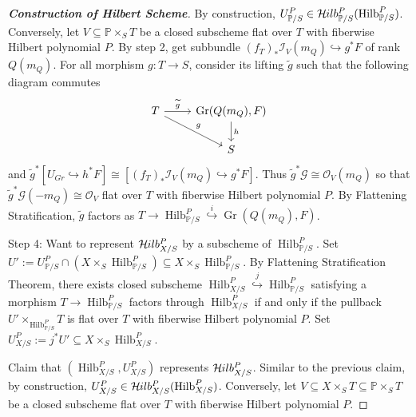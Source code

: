 \documentclass{ctexart}
\newcommand{\grassmannianscheme}[2]{\operatorname{Gr}(#1, #2)}
\newcommand{\hilbertscheme}{\operatorname{Hilb}}
\newcommand{\hilbertfunctor}{\mathcal{H}\kern -.5pt ilb}
\begin{document}
\begin{proof}[\textbf{\emph{Construction of Hilbert Scheme}}]
    By construction, $U_{\mathbb{P}/S}^{P}\in \hilbertfunctor_{\mathbb{P}/S}^{P}(\hilbertscheme_{\mathbb{P}/S}^{P})$.
    Conversely, let $V \subseteq \mathbb{P} \times_{S} T$ be a closed subscheme flat over $T$ with fiberwise Hilbert polynomial $P$.
    By step 2, get subbundle $(f_{T})_{\ast}\mathcal{I}_{V}(m_{Q}) \hookrightarrow g^{\ast}F$ of rank $Q(m_{Q})$.
    For all morphism $g: T \longrightarrow S$, consider its lifting $\widetilde{g}$ such that the following diagram commutes
    \begin{equation*}
        \begin{tikzcd}
            T \arrow[r, "\widetilde{g}"] \arrow[dr, "g"] &
            \grassmannianscheme{Q(m_{Q})}{F} \arrow[d, "h"] \\
            & S
        \end{tikzcd}
    \end{equation*}
    and $\widetilde{g}^{\ast}[U_{Gr} \hookrightarrow h^{\ast}F] \cong [(f_{T})_{\ast}\mathcal{I}_{V}(m_{Q}) \hookrightarrow g^{\ast}F]$.
    Thus $\widetilde{g}^{\ast}\mathcal{G} \cong \mathcal{O}_{V}(m_{Q})$ so that $\widetilde{g}^{\ast}\mathcal{G}(-m_{Q}) \cong \mathcal{O}_{V}$ flat over $T$ with fiberwise Hilbert polynomial $P$.
    By Flattening Stratification, $\widetilde{g}$ factors as $T \longrightarrow \hilbertscheme_{\mathbb{P}/S}^{P} \overset{i}{\hookrightarrow} \grassmannianscheme{Q(m_{Q})}{F}$.
    \par
    Step 4: Want to represent $\hilbertfunctor_{X/S}^{P}$ by a subscheme of $\hilbertscheme_{\mathbb{P}/S}^{P}$.
    Set $U' := U_{\mathbb{P}/S}^{P} \cap (X \times_{S} \hilbertscheme_{\mathbb{P}/S}^{P}) \subseteq X \times_{S} \hilbertscheme_{\mathbb{P}/S}^{P}$.
    By Flattening Stratification Theorem, there exists closed subscheme $\hilbertscheme_{X/S}^{P} \overset{j}{\hookrightarrow} \hilbertscheme_{\mathbb{P}/S}^{P}$ satisfying a morphism $T \longrightarrow \hilbertscheme_{\mathbb{P}/S}^{P}$ factors through $\hilbertscheme_{X/S}^{P}$ if and only if the pullback $U' \times_{\hilbertscheme_{\mathbb{P}/S}^{P}} T$ is flat over $T$ with fiberwise Hilbert polynomial $P$.
    Set $U_{X/S}^{P} := j^{\ast}U' \subseteq X \times_{S} \hilbertscheme_{X/S}^{P}$.
    \par
    Claim that $(\hilbertscheme_{X/S}^{P}, U_{X/S}^{P})$ represents $\hilbertfunctor_{X/S}^{P}$.
    Similar to the previous claim, by construction, $U_{X/S}^{P}\in \hilbertfunctor_{X/S}^{P}(\hilbertscheme_{X/S}^{P})$.
    Conversely, let $V \subseteq X \times_{S} T \subseteq \mathbb{P} \times_{S} T$ be a closed subscheme flat over $T$ with fiberwise Hilbert polynomial $P$.

\end{proof}
\end{document}
